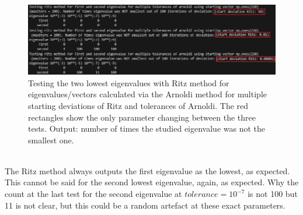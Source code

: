 \documentclass[11pt, letterpaper, onecolumn]{article}
\begin{document}
	\begin{figure} [h] 
	\begin{center}	
	\includegraphics[width=19cm]{"test_ritz-N220-dev0.01.png"}
	\caption{Testing the two lowest eigenvalues with Ritz method for eigenvalues/vectors calculated via the Arnoldi method for multiple starting deviations of Ritz and tolerances of Arnoldi. The red rectangles show the only parameter changing between the three tests. Output: number of times the studied eigenvalue was not the smallest one.} \label{fig:test_ritz}
	\end{center}
	\end{figure}
	\\
	The Ritz method always outputs the first eigenvalue as the lowest, as expected. This cannot be said for the second lowest eigenvalue, again, as expected. Why the count at the last test for the second eigenvalue at $tolerance=10^{-7}$ is not 100 but 11 is not clear, but this could be a random artefact at these exact parameters.
	
	
\end{document}
